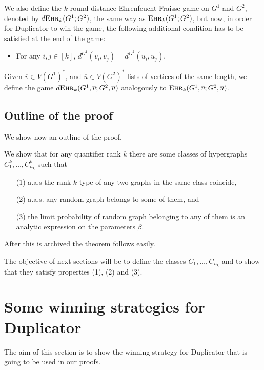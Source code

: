\documentclass[12pt,notitlepage,a4paper]{article}
\theoremstyle{definition}
\newcommand{\ehr}{\textsc{Ehr}}
\begin{document}
We also define the $k$-round distance Ehrenfeucht-Fraisse game on 
$G^1$ and $G^2$, denoted by $d\ehr_k(G^1;G^2)$, the same way as
$\ehr_k(G^1;G^2)$, but now, in order for Duplicator to win the
game, the following additional condition has to be satisfied 
at the end of the game:
\begin{itemize}
	\item For any $i,j\in [k]$, $d^{G^1}(v_i,v_j)=d^{G^2}(u_i,u_j)$.
\end{itemize}

Given $\overline{v}\in V(G^1)^*$, and $\overline{u}\in V(G^2)^*$
lists of vertices of the same length,
we define the game 
$d\ehr_k(G^1,\overline{v};G^2,\overline{u})$ analogously to 
$\ehr_k(G^1,\overline{v};G^2,\overline{u})$.



\subsection{Outline of the proof}

We show now an outline of the proof. \par 
We show that for any quantifier rank $k$ there are some classes of
hypergraphs 
$C^k_1,\dots, C^k_{n_k}$ such that
\begin{itemize}[noitemsep, topsep=0pt]
	\item[(1)] a.a.s the rank $k$ type of any two graphs in the same class coincide, 
	\item[(2)] a.a.s. any random graph belongs to some of them, and
	\item[(3)] the limit probability of random graph belonging to 
	any of them is an analytic expression on the parameters $\overline{\beta}$. 
\end{itemize}

After this is archived the theorem follows easily. 

The objective of next sections will be to define the classes 
$C_1,\dots, C_{n_k}$ and to show that they satisfy properties (1), (2) and (3).


\section{Some winning strategies for Duplicator}

The aim of this section is to show the winning strategy
for Duplicator that is going to be used in our proofs. \par
\end{document}
